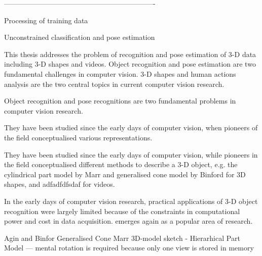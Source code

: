 \documentclass[10pt, a4paper]{article}
\begin{document}
----------------------------------------------------------------

Processing of training data 

Unconstrained classification and pose estimation 


This thesis addresses the problem of recognition and pose estimation of 3-D data including 3-D shapes and videos.  Object recognition and pose estimation are two fundamental challenges in computer vision.  3-D shapes and human actions analysis are the two central topics in current computer vision research. 

Object recognition and pose recognitions are two fundamental problems in computer vision research. 

They have been studied since the early days of computer vision, when pioneers of the field conceptualised various representations.

They have been studied since the early days of computer vision, while pioneers in the field conceptualised different methods to describe a 3-D object, e.g. the cylindrical part model by Marr and generalised cone model by Binford for 3D shapes, and adfadfdfsdaf for videos.    

In the early days of computer vision research, practical applications of 3-D object recognition were largely limited because of the constraints in computational power and cost in data acquisition.  emerges again as a popular area of research.    

Agin and Binfor Generalised Cone
Marr 3D-model sketch - Hierarhical Part Model --- mental rotation is required because only one view is stored in memory 



 

\end{document}
